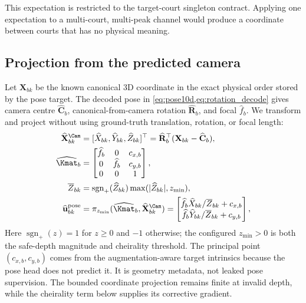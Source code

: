 This expectation is restricted to the target-court singleton \KP contract.
Applying one expectation to a multi-court, multi-peak channel would produce a
coordinate between courts that has no physical meaning.

\subsection{Projection from the predicted camera}

Let \(\mathbf{X}_{bk}\) be the known canonical 3D coordinate in the exact
physical order stored by the pose target.  The decoded pose in
\cref{eq:pose10d,eq:rotation_decode} gives camera centre
\(\widehat{\mathbf{C}}_b\), canonical-from-camera rotation
\(\widehat{\mathbf{R}}_b\), and focal \(\widehat f_b\).  We transform and
project without using ground-truth translation, rotation, or focal length:
\begin{align}
  \widehat{\mathbf{X}}^{\Cam}_{bk}
    &=[\widehat X_{bk},\widehat Y_{bk},\widehat Z_{bk}]^{\top}
      =\widehat{\mathbf{R}}_b^{\top}
      (\mathbf{X}_{bk}-\widehat{\mathbf{C}}_b), \\
  \widehat{\Kmat}_b
    &=\begin{bmatrix}
       \widehat f_b&0&c_{x,b}\\
       0&\widehat f_b&c_{y,b}\\
       0&0&1
      \end{bmatrix}, \\
  \overline Z_{bk}
    &=\operatorname{sgn}_{+}(\widehat Z_{bk})
      \max(|\widehat Z_{bk}|,z_{\min}), \\
  \widehat{\mathbf{u}}^{\mathrm{pose}}_{bk}
    &=\pi_{z_{\min}}(\widehat{\Kmat}_b,
       \widehat{\mathbf{X}}^{\Cam}_{bk})
      =\begin{bmatrix}
        \widehat f_b\widehat X_{bk}/\overline Z_{bk}+c_{x,b}\\
        \widehat f_b\widehat Y_{bk}/\overline Z_{bk}+c_{y,b}
       \end{bmatrix},
  \label{eq:predicted_projection}
\end{align}
Here \(\operatorname{sgn}_{+}(z)=1\) for \(z\geq0\) and \(-1\) otherwise;
the configured \(z_{\min}>0\) is both the safe-depth magnitude and cheirality
threshold.  The principal point \((c_{x,b},c_{y,b})\) comes from the
augmentation-aware target intrinsics because the pose head does not predict it.
It is geometry metadata, not leaked pose supervision.  The bounded coordinate
projection remains finite at invalid depth, while the cheirality term below
supplies its corrective gradient.

